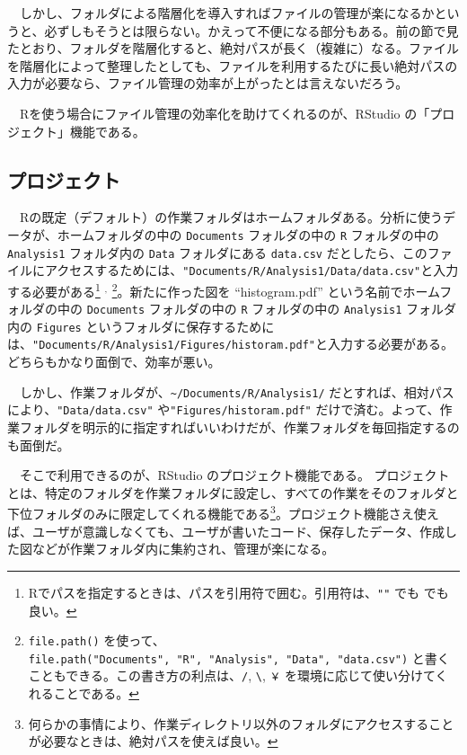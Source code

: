 \documentclass[
  a4paper,
  pandoc,
  ja=standard,
  jafont=haranoaji]{bxjsbook}
\begin{document}
　しかし、フォルダによる階層化を導入すればファイルの管理が楽になるかというと、必ずしもそうとは限らない。かえって不便になる部分もある。前の節で見たとおり、フォルダを階層化すると、絶対パスが長く（複雑に）なる。ファイルを階層化によって整理したとしても、ファイルを利用するたびに長い絶対パスの入力が必要なら、ファイル管理の効率が上がったとは言えないだろう。

　Rを使う場合にファイル管理の効率化を助けてくれるのが、RStudio
の「プロジェクト」機能である。

\hypertarget{ux30d7ux30edux30b8ux30a7ux30afux30c8}{%
\subsection{プロジェクト}\label{ux30d7ux30edux30b8ux30a7ux30afux30c8}}

　Rの既定（デフォルト）の作業フォルダはホームフォルダある。分析に使うデータが、ホームフォルダの中の
\texttt{Documents} フォルダの中の \texttt{R} フォルダの中の
\texttt{Analysis1} フォルダ内の \texttt{Data} フォルダにある
\texttt{data.csv}
だとしたら、このファイルにアクセスするためには、\texttt{"Documents/R/Analysis1/Data/data.csv"}と入力する必要がある\footnote{Rでパスを指定するときは、パスを引用符で囲む。引用符は、\texttt{""}
  でも \texttt{\textquotesingle{}\textquotesingle{}} でも良い。} \(^,\)
\footnote{\texttt{file.path()}
  を使って、\texttt{file.path("Documents",\ "R",\ "Analysis",\ "Data",\ "data.csv")}
  と書くこともできる。この書き方の利点は、\texttt{/},
  \texttt{\textbackslash{}}, \texttt{￥}
  を環境に応じて使い分けてくれることである。}。新たに作った図を
``histogram.pdf'' という名前でホームフォルダの中の \texttt{Documents}
フォルダの中の \texttt{R} フォルダの中の \texttt{Analysis1} フォルダ内の
\texttt{Figures}
というフォルダに保存するためには、\texttt{"Documents/R/Analysis1/Figures/historam.pdf"}と入力する必要がある。どちらもかなり面倒で、効率が悪い。

　しかし、作業フォルダが、\texttt{\textasciitilde{}/Documents/R/Analysis1/}
だとすれば、相対パスにより、\texttt{"Data/data.csv"}
や\texttt{"Figures/historam.pdf"}
だけで済む。よって、作業フォルダを明示的に指定すればいいわけだが、作業フォルダを毎回指定するのも面倒だ。

　そこで利用できるのが、RStudio のプロジェクト機能である。
プロジェクトとは、特定のフォルダを作業フォルダに設定し、すべての作業をそのフォルダと下位フォルダのみに限定してくれる機能である\footnote{何らかの事情により、作業ディレクトリ以外のフォルダにアクセスすることが必要なときは、絶対パスを使えば良い。}。プロジェクト機能さえ使えば、ユーザが意識しなくても、ユーザが書いたコード、保存したデータ、作成した図などが作業フォルダ内に集約され、管理が楽になる。
\end{document}
